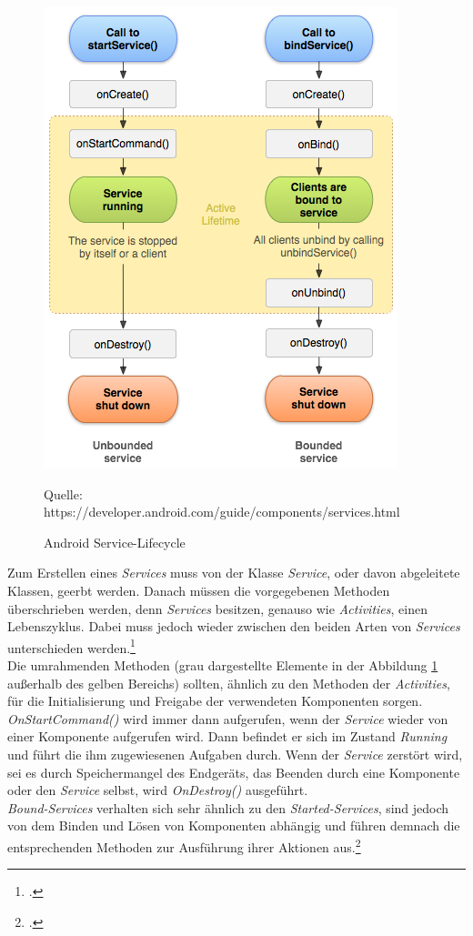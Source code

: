 \begin{figure}[!h]
\centering
\includegraphics[width=0.5\linewidth]{content/images/Android-ServiceLifecycle}
\caption{Android Service-Lifecycle}
Quelle: https://developer.android.com/guide/components/services.html
\label{pic:androidServiceLifecycle}
\end{figure}

Zum Erstellen eines \textit{Services} muss von der Klasse \textit{Service}, oder davon abgeleitete Klassen, geerbt werden. Danach müssen die vorgegebenen Methoden überschrieben werden, denn \textit{Services} besitzen, genauso wie \textit{Activities}, einen Lebenszyklus. Dabei muss jedoch wieder zwischen den beiden Arten von \textit{Services} unterschieden werden.\footcite[S. 168f.]{Android-BeckerPant}\\
Die umrahmenden Methoden (grau dargestellte Elemente in der Abbildung \ref{pic:androidServiceLifecycle} außerhalb des gelben Bereichs) sollten, ähnlich zu den Methoden der \textit{Activities}, für die Initialisierung und Freigabe der verwendeten Komponenten sorgen. \textit{OnStartCommand()} wird immer dann aufgerufen, wenn der \textit{Service} wieder von einer Komponente aufgerufen wird. Dann befindet er sich im Zustand \textit{Running} und führt die ihm zugewiesenen Aufgaben durch. Wenn der \textit{Service} zerstört wird, sei es durch Speichermangel des Endgeräts, das Beenden durch eine Komponente oder den \textit{Service} selbst, wird \textit{OnDestroy()} ausgeführt.\\
\textit{Bound-Services} verhalten sich sehr ähnlich zu den \textit{Started-Services}, sind jedoch von dem Binden und Lösen von Komponenten abhängig und führen demnach die entsprechenden Methoden zur Ausführung ihrer Aktionen aus.\footcite{Android-Services}
